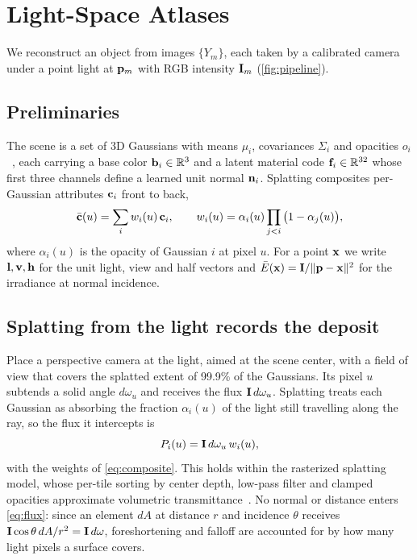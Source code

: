 \section{Light-Space Atlases}
\label{sec:method}



We reconstruct an object from images $\{Y_m\}$, each taken by a calibrated camera under a point light at $\mathbf{p}_m$ with RGB intensity $\mathbf{I}_m$ (\cref{fig:pipeline}).

\subsection{Preliminaries}
\label{sec:prelim}
The scene is a set of 3D Gaussians with means $\mu_i$, covariances $\Sigma_i$ and opacities $o_i$~\cite{kerbl20233d}, each carrying a base color $\mathbf{b}_i\in\mathbb R^3$ and a latent material code $\mathbf{f}_i\in\mathbb R^{32}$ whose first three channels define a learned unit normal $\mathbf{n}_i$.
Splatting composites per-Gaussian attributes $\mathbf{c}_i$ front to back,
\begin{equation}
  \bar{\mathbf{c}}(u)=\sum_i w_i(u)\,\mathbf{c}_i,\qquad w_i(u)=\alpha_i(u)\prod_{j<i}\big(1-\alpha_j(u)\big),
  \label{eq:composite}
\end{equation}
where $\alpha_i(u)$ is the opacity of Gaussian $i$ at pixel $u$.
For a point $\mathbf{x}$ we write $\mathbf{l},\mathbf{v},\mathbf{h}$ for the unit light, view and half vectors and $\bar E(\mathbf{x})=\mathbf{I}/\|\mathbf{p}-\mathbf{x}\|^2$ for the irradiance at normal incidence.

\subsection{Splatting from the light records the deposit}
\label{sec:deposit}
Place a perspective camera at the light, aimed at the scene center, with a field of view that covers the splatted extent of 99.9\% of the Gaussians.
Its pixel $u$ subtends a solid angle $d\omega_u$ and receives the flux $\mathbf{I}\,d\omega_u$.
Splatting treats each Gaussian as absorbing the fraction $\alpha_i(u)$ of the light still travelling along the ray, so the flux it intercepts is
\begin{equation}
  P_i(u)=\mathbf{I}\,d\omega_u\,w_i(u),
  \label{eq:flux}
\end{equation}
with the weights of \cref{eq:composite}.
This holds within the rasterized splatting model, whose per-tile sorting by center depth, low-pass filter and clamped opacities approximate volumetric transmittance~\cite{radl2024stopthepop,huang2024error,talegaonkar2025volumetrically,yu2024mip}.
No normal or distance enters \cref{eq:flux}: since an element $dA$ at distance $r$ and incidence $\theta$ receives $\mathbf{I}\cos\theta\,dA/r^2=\mathbf{I}\,d\omega$, foreshortening and falloff are accounted for by how many light pixels a surface covers.

